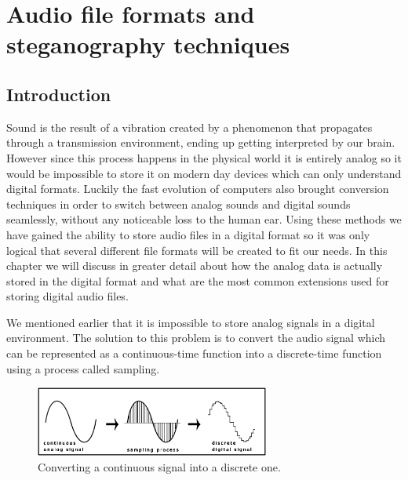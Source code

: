 
\chapter{Audio file formats and steganography techniques}

\begin{multicols}{2}
\section{Introduction}
Sound is the result of a vibration created by a phenomenon that propagates through a transmission environment, ending up getting interpreted by our brain. However since this process happens in the physical world it is entirely analog so it would be impossible to store it on modern day devices which can only understand digital formats. Luckily the fast evolution of computers also brought conversion techniques in order to switch between analog sounds and digital sounds seamlessly, without any noticeable loss to the human ear. Using these methods we have gained the ability to store audio files in a digital format so it was only logical that several different file formats will be created to fit our needs. In this chapter we will discuss in greater detail about how the analog data is actually stored in the digital format and what are the most common extensions used for storing digital audio files.

We mentioned earlier that it is impossible to store analog signals in a digital environment. The solution to this problem is to convert the audio signal which can be represented as a continuous-time function into a discrete-time function using a process called sampling. 

\begin{figure}[H]
    \centering
    \includegraphics[width=7.7cm,keepaspectratio]{pics/Sampling-of-audio-signal.png}
    \caption{Converting a continuous signal into a discrete one\cite{real_time_audio_steganography}.}
    \label{sampling-graphic-example}
\end{figure}


\end{multicols}
